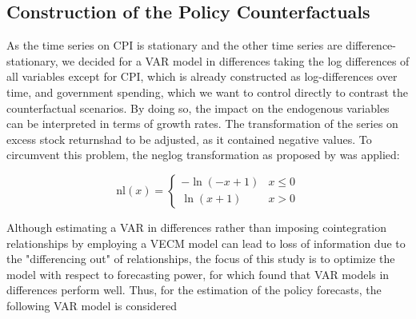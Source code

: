 %

\subsection{Construction of the Policy Counterfactuals}

As the time series on CPI is stationary and the other time series are difference-stationary, we decided for a VAR model in differences taking the log differences of all variables except for CPI, which is already constructed as log-differences over time, and government spending, which we want to control directly to contrast the counterfactual scenarios. By doing so, the impact on the endogenous variables can be interpreted in terms of growth rates. The transformation of the series on excess stock returnshad to be adjusted, as it contained negative values. To circumvent this problem, the neglog transformation as proposed by \citet{whittaker2005} was applied:

\begin{equation}
\text{nl}(x) = 
\begin{cases}
-\ln(-x + 1) & x \leq 0 \\
\ln(x + 1) & x > 0
\end{cases}
\end{equation}



Although estimating a VAR in differences rather than imposing cointegration relationships by employing a VECM model can lead to loss of information due to the "differencing out" of relationships, the focus of this study is to optimize the model with respect to forecasting power, for which \citet{duy1998modeling} found that VAR models in differences perform well. Thus, for the estimation of the policy forecasts, the following VAR model is considered


